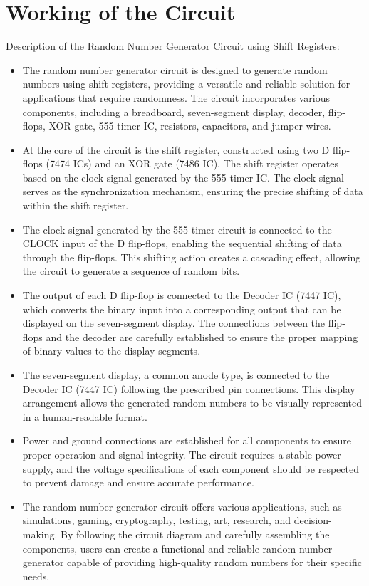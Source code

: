 \documentclass{article}
\begin{document}
\section{Working of the Circuit}
Description of the Random Number Generator Circuit using Shift Registers:
\begin{itemize}
\item The random number generator circuit is designed to generate random numbers using shift registers, providing a versatile and reliable solution for applications that require randomness. The circuit incorporates various components, including a breadboard, seven-segment display, decoder, flip-flops, XOR gate, 555 timer IC, resistors, capacitors, and jumper wires.


\item At the core of the circuit is the shift register, constructed using two D flip-flops (7474 ICs) and an XOR gate (7486 IC). The shift register operates based on the clock signal generated by the 555 timer IC. The clock signal serves as the synchronization mechanism, ensuring the precise shifting of data within the shift register.


\item The clock signal generated by the 555 timer circuit is connected to the CLOCK input of the D flip-flops, enabling the sequential shifting of data through the flip-flops. This shifting action creates a cascading effect, allowing the circuit to generate a sequence of random bits.


\item The output of each D flip-flop is connected to the Decoder IC (7447 IC), which converts the binary input into a corresponding output that can be displayed on the seven-segment display. The connections between the flip-flops and the decoder are carefully established to ensure the proper mapping of binary values to the display segments.


\item The seven-segment display, a common anode type, is connected to the Decoder IC (7447 IC) following the prescribed pin connections. This display arrangement allows the generated random numbers to be visually represented in a human-readable format.


\item Power and ground connections are established for all components to ensure proper operation and signal integrity. The circuit requires a stable power supply, and the voltage specifications of each component should be respected to prevent damage and ensure accurate performance.


\item The random number generator circuit offers various applications, such as simulations, gaming, cryptography, testing, art, research, and decision-making. By following the circuit diagram and carefully assembling the components, users can create a functional and reliable random number generator capable of providing high-quality random numbers for their specific needs.
\end{itemize}\\
\\
\end{document}
